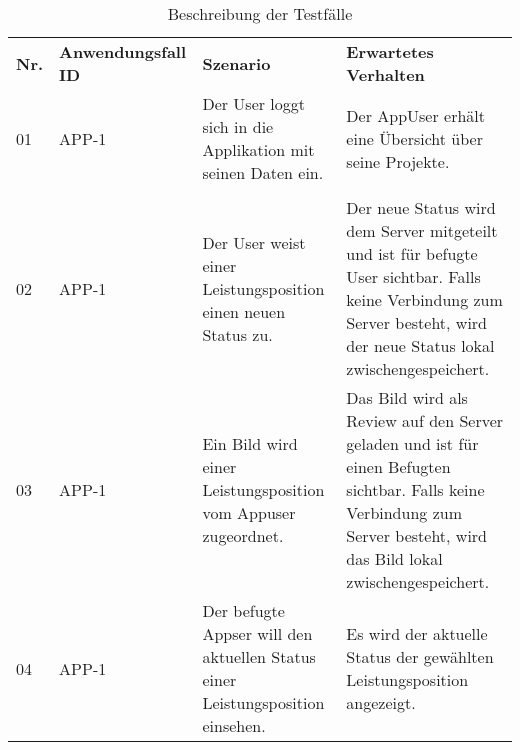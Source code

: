 \centering
\begin{longtable}[c]{|p{1cm}|p{3cm}|p{4cm}|p{6cm}|}
    \caption{Beschreibung der Testfälle}
    \label{fig:testfälle}
    \endlastfoot
    \hline \multicolumn{4}{|r|}{{Weitergeführt auf der folgenden Seite}}                                                                                                                                                                                                                                                                        \\ \hline
    \endfoot
    \hline
    \textbf{Nr.} & \textbf{Anwendungsfall ID} & \textbf{Szenario}                                                                                                  & \textbf{Erwartetes Verhalten}                                                                                                                                              \\ \hline
    \endhead
    \hline
    01           & APP-1                      & Der User loggt sich in die Applikation mit seinen Daten ein.                                                       & Der AppUser erhält eine Übersicht über seine Projekte.   \\ \hline                                                                                                                                                                                                                                                                                                               \\ \hline
    02           & APP-1                      & Der User weist einer Leistungsposition einen neuen Status zu.                                                     & Der neue Status wird dem Server mitgeteilt und ist für befugte User sichtbar. Falls keine Verbindung zum Server besteht, wird der neue Status lokal zwischengespeichert. \\ \hline
    03           & APP-1                      & Ein Bild wird einer Leistungsposition vom Appuser zugeordnet.                                                       & Das Bild wird als Review auf den Server geladen und ist für einen Befugten sichtbar. Falls keine Verbindung zum Server besteht, wird das Bild lokal zwischengespeichert.   \\ \hline
    04           & APP-1                      & Der befugte Appser will den aktuellen Status einer Leistungsposition einsehen.                                     & Es wird der aktuelle Status der gewählten Leistungsposition angezeigt.                                                                                                     \\ \hline

\end{longtable}
